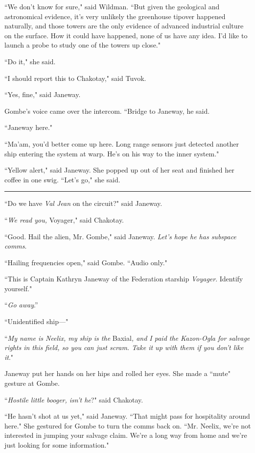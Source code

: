 \documentclass[twoside,letterpaper,12pt]{memoir}
\begin{document}
``We don't know for sure," said Wildman. ``But given the geological and astronomical evidence, it’s very unlikely the greenhouse tipover happened naturally, and those towers are the only evidence of advanced industrial culture on the surface. How it could have happened, none of us have any idea. I’d like to launch a probe to study one of the towers up close."

``Do it," she said.

``I should report this to Chakotay," said Tuvok.

``Yes, fine," said Janeway.

Gombe's voice came over the intercom. ``Bridge to Janeway, he said.

``Janeway here."

``Ma'am, you'd better come up here. Long range sensors just detected another ship entering the system at warp. He's on his way to the inner system."

``Yellow alert," said Janeway. She popped up out of her seat and finished her coffee in one swig. ``Let's go," she said.

\fancybreak{\rule{3cm}{0.4 pt}}
``Do we have \textit{Val Jean} on the circuit?" said Janeway.

``\textit{We read you, }Voyager," said Chakotay.

``Good. Hail the alien, Mr. Gombe," said Janeway. \textit{Let's hope he has subspace comms}.

``Hailing frequencies open," said Gombe. ``Audio only."

``This is Captain Kathryn Janeway of the Federation starship \textit{Voyager}. Identify yourself."

``\textit{Go away}.''

``Unidentified ship---"

``\textit{My name is Neelix, my ship is the }Baxial\textit{, and I paid the Kazon-Ogla for salvage rights in this field, so you can just scram. Take it up with them if you don't like it}."

Janeway put her hands on her hips and rolled her eyes. She made a ``mute" gesture at Gombe.

``\textit{Hostile little booger, isn't he}?" said Chakotay.

``He hasn't shot at us yet," said Janeway. ``That might pass for hospitality around here." She gestured for Gombe to turn the comms back on. ``Mr. Neelix, we're not interested in jumping your salvage claim. We're a long way from home and we're just looking for some information."
\end{document}

